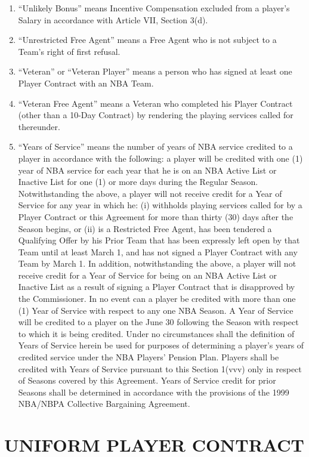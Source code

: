 \documentclass[
]{book}
\begin{document}
\begin{enumerate}
\item
  ``Unlikely Bonus'' means Incentive Compensation excluded from a player's Salary in accordance with Article VII, Section 3(d).
\item
  ``Unrestricted Free Agent'' means a Free Agent who is not subject to a Team's right of first refusal.
\item
  ``Veteran'' or ``Veteran Player'' means a person who has signed at least one Player Contract with an NBA Team.
\item
  ``Veteran Free Agent'' means a Veteran who completed his Player Contract (other than a 10-Day Contract) by rendering the playing services called for thereunder.
\item
  ``Years of Service'' means the number of years of NBA service credited to a player in accordance with the following: a player will be credited with one (1) year of NBA service for each year that he is on an NBA Active List or Inactive List for one (1) or more days during the Regular Season. Notwithstanding the above, a player will not receive credit for a Year of Service for any year in which he: (i) withholds playing services called for by a Player Contract or this Agreement for more than thirty (30) days after the Season begins, or (ii) is a Restricted Free Agent, has been tendered a Qualifying Offer by his Prior Team that has been expressly left open by that Team until at least March 1, and has not signed a Player Contract with any Team by March 1. In addition, notwithstanding the above, a player will not receive credit for a Year of Service for being on an NBA Active List or Inactive List as a result of signing a Player Contract that is disapproved by the Commissioner. In no event can a player be credited with more than one (1) Year of Service with respect to any one NBA Season. A Year of Service will be credited to a player on the June 30 following the Season with respect to which it is being credited. Under no circumstances shall the definition of Years of Service herein be used for purposes of determining a player's years of credited service under the NBA Players' Pension Plan. Players shall be credited with Years of Service pursuant to this Section 1(vvv) only in respect of Seasons covered by this Agreement. Years of Service credit for prior Seasons shall be determined in accordance with the provisions of the 1999 NBA/NBPA Collective Bargaining Agreement.
\end{enumerate}

\hypertarget{uniform-player-contract}{%
\chapter{UNIFORM PLAYER CONTRACT}\label{uniform-player-contract}}
\end{document}

